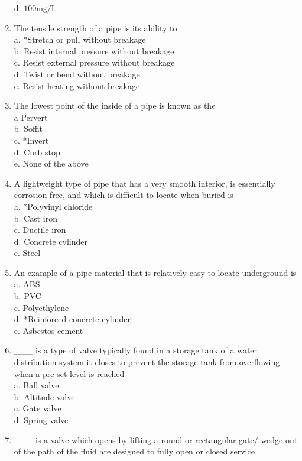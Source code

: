 \begin{enumerate}[1.]
d. $100 \mathrm{mg} / \mathrm{L}$\\
\item The tensile strength of a pipe is its ability to\\
a. *Stretch or pull without breakage\\
b. Resist internal pressure without breakage\\
c. Resist external pressure without breakage\\
d. Twist or bend without breakage\\
e. Resist heating without breakage\\
\item The lowest point of the inside of a pipe is known as the\\
a Pervert\\
b. Soffit\\
c. *Invert\\
d. Curb stop\\
e. None of the above\\
\item A lightweight type of pipe that has a very smooth interior, is essentially corrosion-free, and which is difficult to locate when buried is\\
a. *Polyvinyl chloride\\
b. Cast iron\\
c. Ductile iron\\
d. Concrete cylinder\\
e. Steel\\
\item An example of a pipe material that is relatively easy to locate underground is\\
a. ABS\\
b. PVC\\
c. Polyethylene\\
d. *Reinforced concrete cylinder\\
e. Asbestos-cement\\
\item \_\_\_ is a type of valve typically found in a storage tank of a water distribution system it closes to prevent the storage tank from overflowing when a pre-set level is reached\\
a. Ball valve\\
b. Altitude valve\\
c. Gate valve\\
d. Spring valve\\
\item \_\_\_ is a valve which opens by lifting a round or rectangular gate/ wedge out of the path of the fluid are designed to fully open or closed service\\

\end{enumerate}

